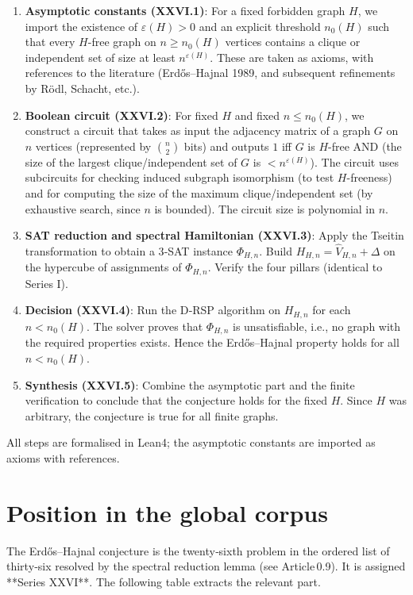 \documentclass[11pt,a4paper]{article}
\begin{document}
\begin{enumerate}
\item \textbf{Asymptotic constants (XXVI.1)}: For a fixed forbidden graph $H$, we import the existence of $\varepsilon(H)>0$ and an explicit threshold $n_0(H)$ such that every $H$-free graph on $n\ge n_0(H)$ vertices contains a clique or independent set of size at least $n^{\varepsilon(H)}$. These are taken as axioms, with references to the literature (Erdős–Hajnal 1989, and subsequent refinements by Rödl, Schacht, etc.).
\item \textbf{Boolean circuit (XXVI.2)}: For fixed $H$ and fixed $n\le n_0(H)$, we construct a circuit that takes as input the adjacency matrix of a graph $G$ on $n$ vertices (represented by $\binom{n}{2}$ bits) and outputs $1$ iff $G$ is $H$-free AND (the size of the largest clique/independent set of $G$ is $< n^{\varepsilon(H)}$). The circuit uses subcircuits for checking induced subgraph isomorphism (to test $H$-freeness) and for computing the size of the maximum clique/independent set (by exhaustive search, since $n$ is bounded). The circuit size is polynomial in $n$.
\item \textbf{SAT reduction and spectral Hamiltonian (XXVI.3)}: Apply the Tseitin transformation to obtain a 3‑SAT instance $\Phi_{H,n}$. Build $H_{H,n} = \hat{V}_{H,n} + \Delta$ on the hypercube of assignments of $\Phi_{H,n}$. Verify the four pillars (identical to Series I).
\item \textbf{Decision (XXVI.4)}: Run the D‑RSP algorithm on $H_{H,n}$ for each $n < n_0(H)$. The solver proves that $\Phi_{H,n}$ is unsatisfiable, i.e., no graph with the required properties exists. Hence the Erdős–Hajnal property holds for all $n < n_0(H)$.
\item \textbf{Synthesis (XXVI.5)}: Combine the asymptotic part and the finite verification to conclude that the conjecture holds for the fixed $H$. Since $H$ was arbitrary, the conjecture is true for all finite graphs.
\end{enumerate}

All steps are formalised in Lean4; the asymptotic constants are imported as axioms with references.

\section{Position in the global corpus}

The Erdős–Hajnal conjecture is the twenty‑sixth problem in the ordered list of thirty‑six resolved by the spectral reduction lemma (see Article 0.9). It is assigned **Series XXVI**. The following table extracts the relevant part.
\end{document}
